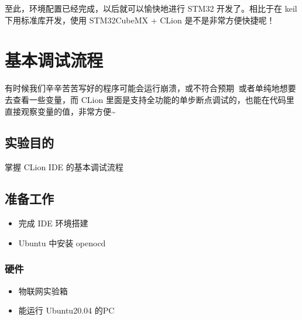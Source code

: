\documentclass[a4paper,12pt,english]{sphinxmanual}
\begin{document}
\sphinxAtStartPar
{}

\sphinxAtStartPar
{}

\sphinxAtStartPar
至此，环境配置已经完成，以后就可以愉快地进行 STM32 开发了。相比于在 keil 下用标准库开发，使用 STM32CubeMX + CLion 是不是非常方便快捷呢！

\sphinxstepscope


\section{基本调试流程}
\label{\detokenize{exp-stm32/debug-flow:id1}}\label{\detokenize{exp-stm32/debug-flow::doc}}
\sphinxAtStartPar
有时候我们辛辛苦苦写好的程序可能会运行崩溃，或不符合预期💢💢或者单纯地想要去查看一些变量，而 CLion 里面是支持全功能的单步断点调试的，也能在代码里直接观察变量的值，非常方便\textasciitilde{}


\subsection{实验目的}
\label{\detokenize{exp-stm32/debug-flow:id2}}
\sphinxAtStartPar
掌握 CLion IDE 的基本调试流程


\subsection{准备工作}
\label{\detokenize{exp-stm32/debug-flow:id3}}\begin{itemize}
\item {} 
\sphinxAtStartPar
完成 IDE 环境搭建

\item {} 
\sphinxAtStartPar
Ubuntu 中安装 openocd

\end{itemize}


\subsubsection{硬件}
\label{\detokenize{exp-stm32/debug-flow:id4}}\begin{itemize}
\item {} 
\sphinxAtStartPar
物联网实验箱

\item {} 
\sphinxAtStartPar
能运行 Ubuntu20.04 的PC

\end{itemize}
\end{document}
